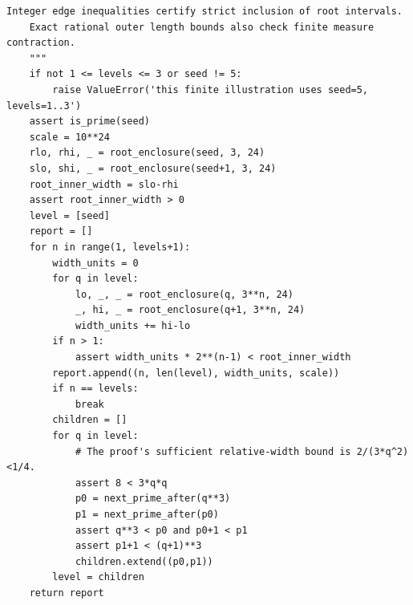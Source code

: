 \documentclass[11pt,reqno]{amsart}
\theoremstyle{blueplain}
\newcounter{asser}
\numberwithin{equation}{section}
\begin{document}
\begin{lstlisting}[style=python,basicstyle=\ttfamily\scriptsize,numberstyle=\scriptsize]
    Integer edge inequalities certify strict inclusion of root intervals.
    Exact rational outer length bounds also check finite measure contraction.
    """
    if not 1 <= levels <= 3 or seed != 5:
        raise ValueError('this finite illustration uses seed=5, levels=1..3')
    assert is_prime(seed)
    scale = 10**24
    rlo, rhi, _ = root_enclosure(seed, 3, 24)
    slo, shi, _ = root_enclosure(seed+1, 3, 24)
    root_inner_width = slo-rhi
    assert root_inner_width > 0
    level = [seed]
    report = []
    for n in range(1, levels+1):
        width_units = 0
        for q in level:
            lo, _, _ = root_enclosure(q, 3**n, 24)
            _, hi, _ = root_enclosure(q+1, 3**n, 24)
            width_units += hi-lo
        if n > 1:
            assert width_units * 2**(n-1) < root_inner_width
        report.append((n, len(level), width_units, scale))
        if n == levels:
            break
        children = []
        for q in level:
            # The proof's sufficient relative-width bound is 2/(3*q^2)<1/4.
            assert 8 < 3*q*q
            p0 = next_prime_after(q**3)
            p1 = next_prime_after(p0)
            assert q**3 < p0 and p0+1 < p1
            assert p1+1 < (q+1)**3
            children.extend((p0,p1))
        level = children
    return report


\end{lstlisting}
\end{document}
